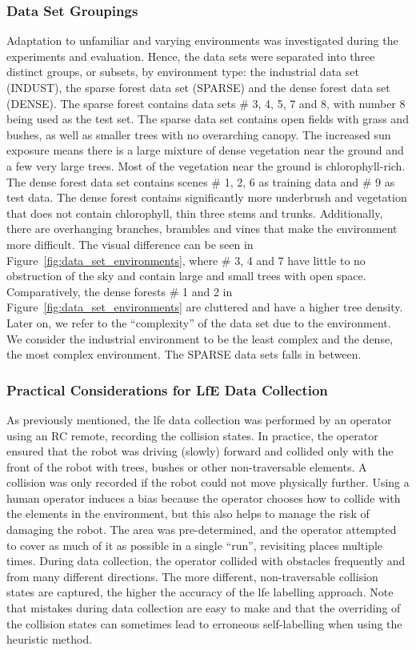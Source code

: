 \subsubsection{Data Set Groupings}
Adaptation to unfamiliar and varying environments was investigated during the experiments and evaluation. Hence, the data sets were separated into three distinct groups, or subsets, by environment type: the industrial data set (INDUST), the sparse forest data set (SPARSE) and the dense forest data set (DENSE). The sparse forest contains data sets \# 3, 4, 5, 7 and 8, with number 8 being used as the test set. The sparse data set contains open fields with grass and bushes, as well as smaller trees with no overarching canopy. The increased sun exposure means there is a large mixture of dense vegetation near the ground and a few very large trees. Most of the vegetation near the ground is chlorophyll-rich. The dense forest data set contains scenes \# 1, 2, 6 as training data and \# 9 as test data. The dense forest contains significantly more underbrush and vegetation that does not contain chlorophyll, thin three stems and trunks. Additionally, there are overhanging branches, brambles and vines that make the environment more difficult. The visual difference can be seen in Figure~\ref{fig:data_set_environments}, where \# 3, 4 and 7 have little to no obstruction of the sky and contain large and small trees with open space. Comparatively, the dense forests \# 1 and 2 in Figure~\ref{fig:data_set_environments} are cluttered and have a higher tree density.
%
Later on, we refer to the ``complexity'' of the data set due to the environment. We consider the industrial environment to be the least complex and the dense, the most complex environment. The SPARSE data sets falls in between. 


\subsubsection{Practical Considerations for LfE Data Collection}
\label{ch5:pratical_colmap}
As previously mentioned, the \ac{lfe} data collection was performed by an operator using an RC remote, recording the collision states. In practice, the operator ensured that the robot was driving (slowly) forward and collided only with the front of the robot with trees, bushes or other non-traversable elements. A collision was only recorded if the robot could not move physically further. Using a human operator induces a bias because the operator chooses how to collide with the elements in the environment, but this also helps to manage the risk of damaging the robot. The area was pre-determined, and the operator attempted to cover as much of it as possible in a single ``run'', revisiting places multiple times. During data collection, the operator collided with obstacles frequently and from many different directions. The more different, non-traversable collision states are captured, the higher the accuracy of the \ac{lfe} labelling approach. Note that mistakes during data collection are easy to make and that the overriding of the collision states can sometimes lead to erroneous self-labelling when using the heuristic method. 

